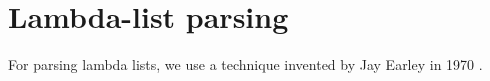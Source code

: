\chapter{Lambda-list parsing}
\label{chap-internals-lambda-list-parsing}

For parsing lambda lists, we use a technique invented by Jay Earley in
1970 \cite{Earley:1970:ECP:362007.362035, Earley:1983:ECP:357980.358005}.
